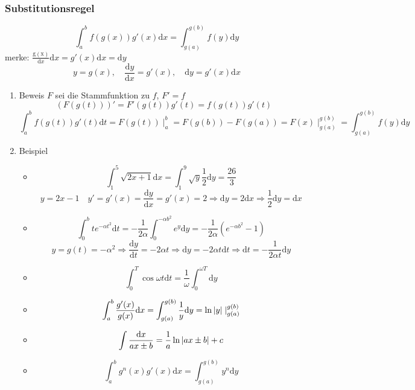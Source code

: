 \documentclass[11pt]{article}
\DeclarePairedDelimiter\abs{\lvert}{\rvert}%
\begin{document}
\subsubsection{Substitutionsregel}
\label{sec-11-3-2}
\[\int_a^b f(g(x))g'(x)\mathrm{d}x=\int_{g(a)}^{g(b)}f(y)\mathrm{d}y\]
merke: $\frac{\mathrm{g(x)}}{\mathrm{d}x} \mathrm{d}x = g'(x)\mathrm{d}x = \mathrm{d}y$
\[y=g(x),\quad\frac{\mathrm{d}y}{\mathrm{d}x}=g'(x),\quad\mathrm{d}y = g'(x)\mathrm{d}x\]
\begin{enumerate}
\item Beweis
\label{sec-11-3-2-1}
$F$ sei die Stammfunktion zu $f$, $F' = f$
\[(F(g(t)))' = F'(g(t))g'(t) = f(g(t))g'(t)\]
\[\int_a^b f(g(t))g'(t)\mathrm{d}t = F(g(t))\mid_a^b=F(g(b)) - F(g(a)) = F(x)\mid_{g(a)}^{g(b)} = \int_{g(a)}^{g(b)}f(y)\mathrm{d}y\]
\item Beispiel
\label{sec-11-3-2-2}
\begin{itemize}
\item \[\int_1^5\sqrt{2x+1}\mathrm{d}x = \int_1^9\sqrt{y}\frac{1}{2}\mathrm{d}y=\frac{26}{3}\]
       \[y=2x-1\quad y'=g'(x) =\frac{\mathrm{d}y}{\mathrm{d}x} = g'(x) = 2 \Rightarrow \mathrm{d}y = 2\mathrm{d}x \Rightarrow \frac{1}{2}\mathrm{d}y = \mathrm{d}x\]
\item \[\int_0^b t e^{-\alpha t^2}\mathrm{d}t = -\frac{1}{2\alpha}\int_0^{-\alpha b^2} e^y\mathrm{d}y = -\frac{1}{2\alpha}(e^{-\alpha b^2} - 1)\]
       \[y=g(t)=-\alpha ^2 \Rightarrow \frac{\mathrm{d}y}{\mathrm{d}t}=-2\alpha t \Rightarrow \mathrm{d}y=-2\alpha t \mathrm{d}t \Rightarrow \mathrm{d}t = -\frac{1}{2\alpha t}\mathrm{d}y\]
\item \[\int_0^T \cos{\omega t}\mathrm{d}t = \frac{1}{\omega}\int_0^{\omega T}\mathrm{d}y\]
\item \[\int_a^b \frac{g'(x)}{g(x)}\mathrm{d}x = \int_{g(a)}^{g(b)}\frac{1}{y}\mathrm{d}y=\ln{\abs{y}}\mid_{g(a)}^{g(b)}\]
\item \[\int \frac{\mathrm{d}x}{ax\pm b} = \frac{1}{a}\ln{\abs{ax\pm b}} + c\]
\item \[\int_a^b g^n(x)g'(x)\mathrm{d}x = \int_{g(a)}^{g(b)} y^n\mathrm{d}y\]
\end{itemize}
\end{enumerate}
\end{document}
